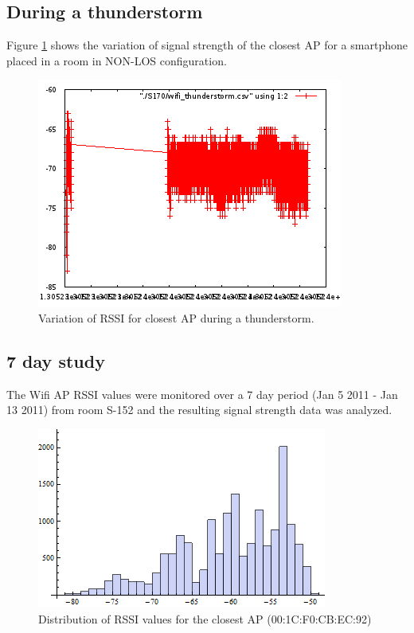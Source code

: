 \subsection{During a thunderstorm}

Figure \ref{fig:closestAPthunderstorm} shows the variation of signal strength of
the closest AP for a smartphone placed in a room in NON-LOS configuration.

\begin{figure}\centering
    \includegraphics{figures/wifi_thunderstorm.png}
    \caption{Variation of RSSI for closest AP during a thunderstorm. \label{fig:closestAPthunderstorm}}
\end{figure}

\subsection{7 day study}

The Wifi AP RSSI values were monitored over a 7 day period (Jan 5 2011 - Jan 13 2011) from room S-152
and the resulting signal strength data was analyzed.

\begin{figure}\centering
    \includegraphics{figures/histogram_00_1C_F0_CB_EC_92.png}
    \caption{Distribution of RSSI values for the closest AP (00:1C:F0:CB:EC:92) \label{fig:histogram_00_1C_F0_CB_EC_92}}
\end{figure}

